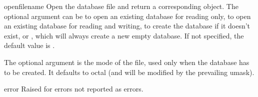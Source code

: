 \begin{funcdesc}{open}{filename}
Open the database file  and return a corresponding object.
The optional  argument can be
 to open an existing database for reading only,
 to open an existing database for reading and writing,
 to create the database if it doesn't exist, or
, which will always create a new empty database.  If not
specified, the default value is .

The optional  argument is the \UNIX{} mode of the file, used
only when the database has to be created.  It defaults to octal
 (and will be modified by the prevailing umask).
\end{funcdesc}

\begin{excdesc}{error}
Raised for errors not reported as  errors.
\end{excdesc}
